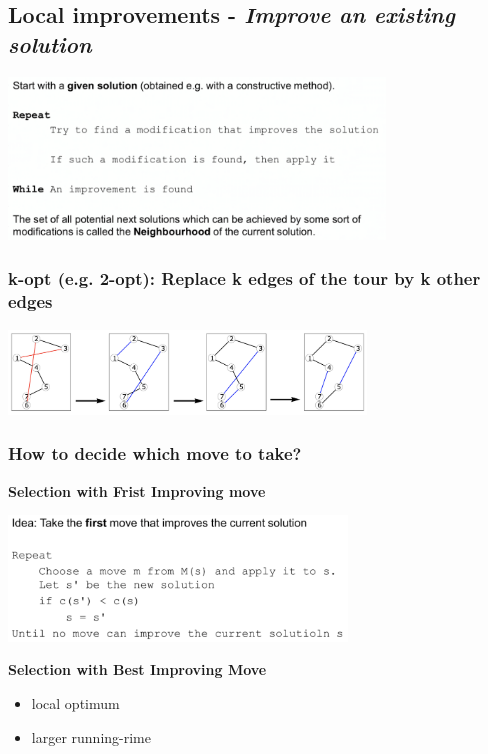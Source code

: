\documentclass[10pt,a4paper,twocolumn]{article}
\newcommand\pro{\item[$+$]}
\newcommand\con{\item[$-$]}
\begin{document}
\subsection{Local improvements - \textit{Improve an existing solution}}

\begin{center}
\includegraphics[width=10cm]{images/local-improvements}
\end{center}

\subsubsection{k-opt (e.g. 2-opt): Replace k edges of the tour by k other edges}

\begin{center}
\includegraphics[width=9.5cm]{images/two-opt}
\end{center}

\subsubsection{How to decide which move to take?}
\textbf{Selection with Frist Improving move}

\begin{center}
\includegraphics[width=9cm]{images/first-improving}
\end{center}


\textbf{Selection with Best Improving Move}
\begin{itemize}
	\pro local optimum
	\con larger running-rime 
\end{itemize}
\end{document}
